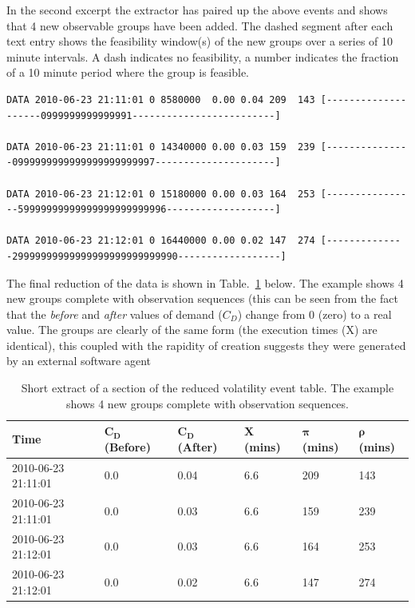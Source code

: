 
In the second excerpt the extractor has paired up the above events and shows that 4 new observable groups have been added. The dashed segment after each text entry shows the feasibility window(s) of the new groups over a series of 10 minute intervals. A dash indicates no feasibility, a number indicates the fraction of a 10 minute period where the group is feasible. 

\tiny
\begin{verbatim}
DATA 2010-06-23 21:11:01 0 8580000  0.00 0.04 209  143 [--------------------0999999999999991-------------------------]

DATA 2010-06-23 21:11:01 0 14340000 0.00 0.03 159  239 [---------------0999999999999999999999997---------------------]

DATA 2010-06-23 21:12:01 0 15180000 0.00 0.03 164  253 [----------------59999999999999999999999996-------------------]

DATA 2010-06-23 21:12:01 0 16440000 0.00 0.02 147  274 [--------------29999999999999999999999999990------------------]
\end{verbatim}
\normalsize

The final reduction of the data is shown in Table.~\ref{tab:volanal} below. The example shows 4 new groups complete with observation sequences (this can be seen from the fact that the \emph{before} and \emph{after} values of demand ($C_D$) change from 0 (zero) to a real value. The groups are clearly of the same form (the execution times (X) are identical), this coupled with the rapidity of creation suggests they were generated by an external software agent

\begin{table}[htbp]
\begin{center}
\begin{tabular}{|l|l|l|l|l|l|}
\hline
\bf{Time} &  $\mathbf{C_D}$ (Before) & $\mathbf{C_D}$ (After) & $\mathbf{X}$ (mins) & $\mathbf{\pi}$ (mins) & $\mathbf{\rho}$ (mins)   \\
\hline
2010-06-23 21:11:01  &  0.0  &  0.04  &  6.6  &  209  &  143 \\
2010-06-23 21:11:01  &  0.0  &  0.03  &  6.6  &  159  &  239 \\
2010-06-23 21:12:01  &  0.0  &  0.03  &  6.6  &  164  &  253 \\
2010-06-23 21:12:01  &  0.0  &  0.02  &  6.6  &  147  &  274 \\
\hline
\end{tabular}
\end{center}
\caption[Short extract of a section of the reduced volatility event table.]
{Short extract of a section of the reduced volatility event table.  The example shows 4 new groups complete with observation sequences.}
\label{tab:volanal}
\end{table}




